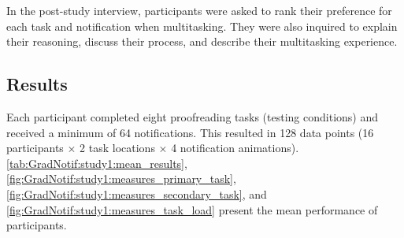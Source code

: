 In the post-study interview, participants were asked to rank their preference for each task \location{} and notification \animation{} when multitasking. They were also inquired to explain their reasoning, discuss their process, and describe their multitasking experience.


\subsection{Results}
\label{sec:GradNotif:study1:results}

Each participant completed eight proofreading tasks (testing conditions) and received a minimum of 64 notifications. This resulted in 128 data points (16 participants $\times$ 2 task locations $\times$ 4 notification animations). \autoref{tab:GradNotif:study1:mean_results}, \autoref{fig:GradNotif:study1:measures_primary_task}, \autoref{fig:GradNotif:study1:measures_secondary_task}, and \autoref{fig:GradNotif:study1:measures_task_load} present the mean performance of participants. 


